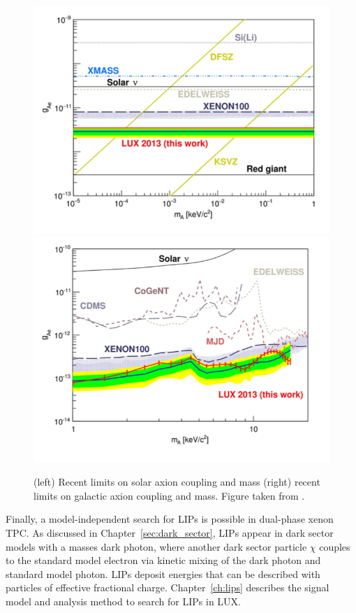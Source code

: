 \begin{figure}[htbp]
\begin{center}
\includegraphics[width=\halffig]{figures/lxetpcs/axions1.png}
\includegraphics[width=\halffig]{figures/lxetpcs/axions2.png}
\caption{(left) Recent limits on solar axion coupling and mass (right) recent limits on galactic axion coupling and mass. Figure taken from \cite{LUXAxions}. }
\label{fig:axions}
\end{center}
\end{figure}

Finally, a model-independent search for \ac{LIP}s is possible in dual-phase xenon \ac{TPC}. As discussed in Chapter~\ref{sec:dark_sector}, \ac{LIP}s appear in dark sector models with a masses dark photon, where another dark sector particle $\chi$ couples to the standard model electron via kinetic mixing of the dark photon and standard model photon. \ac{LIP}s deposit energies that can be described with particles of effective fractional charge. Chapter~\ref{ch:lips} describes the signal model and analysis method to search for \ac{LIP}s in \ac{LUX}. 






